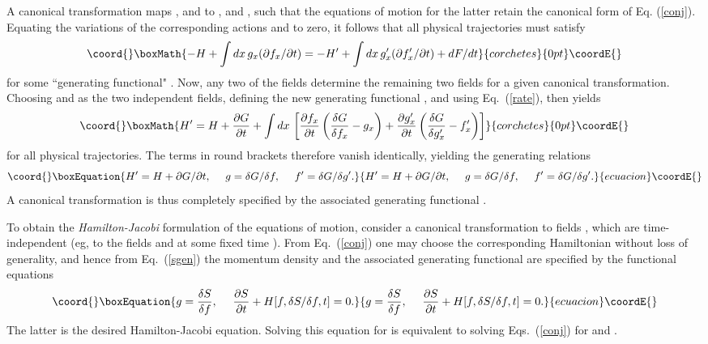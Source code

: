 \documentclass[a4paper,preprint, showpacs, aps, draft]{revtex4}
\begin{document}
{{A canonical transformation maps \coordHE{}, \coordHE{} and \coordHE{} to \coordHE{}, \coordHE{} and \coordHE{},
such that the equations of motion for the latter retain the canonical
form of Eq. (\ref{conj}).  Equating the variations of the corresponding
actions \coordHE{} and \coordHE{} to zero, it follows that all physical trajectories
must satisfy
\[\coord{}\boxMath{
-H + \int dx\, g_x(\partial f_x/\partial t) = -H' + \int dx\,g_x'(\partial
f_x'/\partial t) + dF/dt }{corchetes}{0pt}\coordE{}\]
for some ``generating functional" \coordHE{}.
Now, any two of the fields \coordHE{} determine the remaining two fields for
a given canonical transformation.  Choosing \coordHE{} and \coordHE{} as the two
independent fields, defining the new generating functional \coordHE{}, and using Eq.~(\ref{rate}), then yields 
\[\coord{}\boxMath{
H' = H + \frac{\partial G}{\partial t} + \int dx\, \left[ \frac{\partial
f_x}{\partial t}\left( \frac{\delta G}{\delta f_x} -g_x\right) +
\frac{\partial g_x'}{\partial t}\left(\frac{\delta G}{\delta g_x'} -
f_x'\right)\right] }{corchetes}{0pt}\coordE{}\]
for all physical trajectories.  The terms in round brackets 
therefore vanish identically, yielding the generating relations
\begin{equation}\coord{}\boxEquation{ \label{sgen}
H' = H + \partial G/\partial t,~~~~ g=\delta G/\delta
f,~~~~f'=\delta G/\delta g' .
}{ H' = H + \partial G/\partial t,~~~~ g=\delta G/\delta
f,~~~~f'=\delta G/\delta g' .
}{ecuacion}\coordE{}\end{equation}
A canonical transformation is thus completely specified by the associated
generating functional \coordHE{}.

To obtain the {\it Hamilton-Jacobi} formulation of the  equations of
motion, consider a
canonical transformation to fields \coordHE{}, \coordHE{} which are time-independent
(eg, to the fields \coordHE{} and \coordHE{} at some fixed time \coordHE{}). From 
Eq.~(\ref{conj}) one may  
choose the corresponding Hamiltonian \coordHE{} 
without loss of generality, and hence from 
Eq.~(\ref{sgen}) the momentum density and the associated
generating functional \coordHE{} are specified by the functional equations
\begin{equation}\coord{}\boxEquation{ \label{hj}
g=\frac{\delta S}{\delta f},~~~~
\frac{\partial S}{\partial t} + H[f, \delta S/\delta f,t] = 0 .
}{ g=\frac{\delta S}{\delta f},~~~~
\frac{\partial S}{\partial t} + H[f, \delta S/\delta f,t] = 0 .
}{ecuacion}\coordE{}\end{equation}
The latter is the desired Hamilton-Jacobi equation. Solving this equation for
\coordHE{} is equivalent to solving Eqs.~(\ref{conj}) for \coordHE{} and \coordHE{}. 

}}
\end{document}
